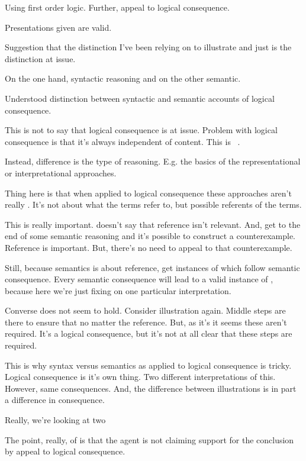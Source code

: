 \begin{note}
  Using first order logic.
  Further, appeal to logical consequence.

  Presentations given are valid.

  Suggestion that the distinction I've been relying on to illustrate \ur{} and \nr{} just is the distinction at issue.

  On the one hand, syntactic reasoning and on the other semantic.

  Understood distinction between syntactic and semantic accounts of logical consequence.

  This is not to say that logical consequence is at issue.
  Problem with logical consequence is that it's always independent of content.
  This is ~\cite{Etchemendy:1990wo,Etchemendy:2008wz}.

  Instead, difference is the type of reasoning.
  E.g. the basics of the representational or interpretational approaches.

  Thing here is that when applied to logical consequence these approaches aren't really \ur{}.
  It's not about what the terms refer to, but possible referents of the terms.

  This is really important.
  \nr{} doesn't say that reference isn't relevant.
  And, get to the end of some semantic reasoning and it's possible to construct a counterexample.
  Reference is important.
  But, there's no need to appeal to that counterexample.

  Still, because semantics is about reference, get instances of \ur{} which follow semantic consequence.
  Every semantic consequence will lead to a valid instance of \ur{}, because here we're just fixing on one particular interpretation.

  Converse does not seem to hold.
  Consider illustration again.
  Middle steps are there to ensure that no matter the reference.
  But, as it's  it seems these aren't required.
  It's a logical consequence, but it's not at all clear that these steps are required.


  This is why syntax versus semantics as applied to logical consequence is tricky.
  Logical consequence is it's own thing.
  Two different interpretations of this.
  However, same consequences.
  And, the difference between illustrations is in part a difference in consequence.

  Really, we're looking at two 

  The point, really, of \ur{} is that the agent is not claiming support for the conclusion by appeal to logical consequence.
\end{note}

